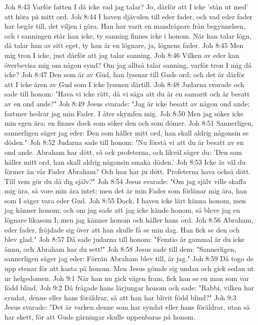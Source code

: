 Joh 8:43  Varför fatten I då icke vad jag talar? Jo, därför att I icke 'stån ut med' att höra på mitt ord.
Joh 8:44  I haven djävulen till eder fader, och vad eder fader har begär till, det viljen i göra. Han har varit en mandråpare från begynnelsen, och i sanningen står han icke, ty sanning finnes icke i honom. När han talar lögn, då talar han av sitt eget, ty han är en lögnare, ja, lögnens fader.
Joh 8:45  Men mig tron I icke, just därför att jag talar sanning.
Joh 8:46  Vilken av eder kan överbevisa mig om någon synd? Om jag alltså talar sanning, varför tron I mig då icke?
Joh 8:47  Den som är av Gud, han lyssnar till Guds ord; och det är därför att I icke ären av Gud som I icke lyssnen därtill.
Joh 8:48  Judarna svarade och sade till honom: "Hava vi icke rätt, då vi säga att du är en samarit och är besatt av en ond ande?"
Joh 8:49  Jesus svarade: "Jag är icke besatt av någon ond ande; fastmer hedrar jag min Fader. I åter skymfen mig.
Joh 8:50  Men jag söker icke min egen ära; en finnes dock som söker den och som dömer.
Joh 8:51  Sannerligen, sannerligen säger jag eder: Den som håller mitt ord, han skall aldrig någonsin se döden."
Joh 8:52  Judarna sade till honom: "Nu förstå vi att du är besatt av en ond ande. Abraham har dött, så ock profeterna, och likväl säger du: 'Den som håller mitt ord, han skall aldrig någonsin smaka döden.'
Joh 8:53  Icke är väl du förmer än vår Fader Abraham? Och han har ju dött. Profeterna hava också dött. Till vem gör du då dig själv?"
Joh 8:54  Jesus svarade: "Om jag själv ville skaffa mig ära, så vore min ära intet; men det är min Fader som förlänar mig ära, han som I säger vara eder Gud.
Joh 8:55  Dock, I haven icke lärt känna honom, men jag känner honom; och om jag sade att jag icke kände honom, så bleve jag en lögnare likasom I; men jag känner honom och håller hans ord.
Joh 8:56  Abraham, eder fader, fröjdade sig över att han skulle få se min dag. Han fick se den och blev glad."
Joh 8:57  Då sade judarna till honom: "Femtio år gammal är du icke ännu, och Abraham har du sett!"
Joh 8:58  Jesus sade till dem: "Sannerligen, sannerligen säger jag eder: Förrän Abraham blev till, är jag."
Joh 8:59  Då togo de upp stenar för att kasta på honom. Men Jesus gömde sig undan och gick sedan ut ur helgedomen.
Joh 9:1  När han nu gick vägen fram, fick han se en man som var född blind.
Joh 9:2  Då frågade hans lärjungar honom och sade: "Rabbi, vilken har syndat, denne eller hans föräldrar, så att han har blivit född blind?"
Joh 9:3  Jesus svarade: "Det är varken denne som har syndat eller hans föräldrar, utan så har skett, för att Guds gärningar skulle uppenbaras på honom.

